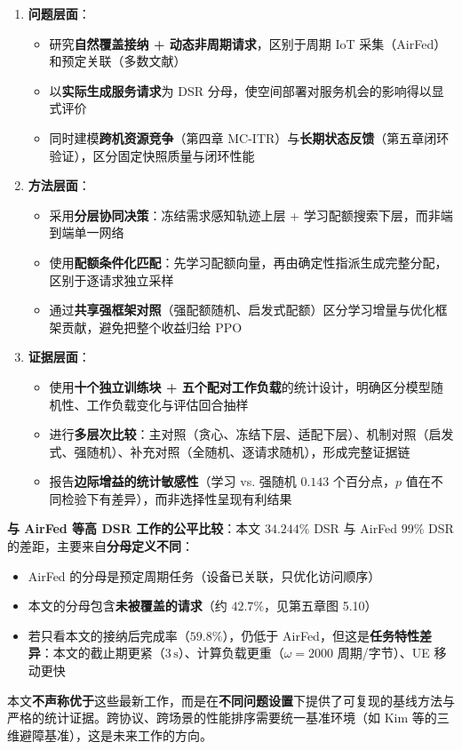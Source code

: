 \begin{enumerate}
    \item \textbf{问题层面}：
    \begin{itemize}
        \item 研究\textbf{自然覆盖接纳 + 动态非周期请求}，区别于周期 IoT 采集（AirFed）和预定关联（多数文献）
        \item 以\textbf{实际生成服务请求}为 DSR 分母，使空间部署对服务机会的影响得以显式评价
        \item 同时建模\textbf{跨机资源竞争}（第四章 MC-ITR）与\textbf{长期状态反馈}（第五章闭环验证），区分固定快照质量与闭环性能
    \end{itemize}
    \item \textbf{方法层面}：
    \begin{itemize}
        \item 采用\textbf{分层协同决策}：冻结需求感知轨迹上层 + 学习配额搜索下层，而非端到端单一网络
        \item 使用\textbf{配额条件化匹配}：先学习配额向量，再由确定性指派生成完整分配，区别于逐请求独立采样
        \item 通过\textbf{共享强框架对照}（强配额随机、启发式配额）区分学习增量与优化框架贡献，避免把整个收益归给 PPO
    \end{itemize}
    \item \textbf{证据层面}：
    \begin{itemize}
        \item 使用\textbf{十个独立训练块 + 五个配对工作负载}的统计设计，明确区分模型随机性、工作负载变化与评估回合抽样
        \item 进行\textbf{多层次比较}：主对照（贪心、冻结下层、适配下层）、机制对照（启发式、强随机）、补充对照（全随机、逐请求随机），形成完整证据链
        \item 报告\textbf{边际增益的统计敏感性}（学习 vs. 强随机 $0.143$ 个百分点，$p$ 值在不同检验下有差异），而非选择性呈现有利结果
    \end{itemize}
\end{enumerate}

\textbf{与 AirFed 等高 DSR 工作的公平比较}：本文 $34.244\%$ DSR 与 AirFed $99\%$ DSR 的差距，主要来自\textbf{分母定义不同}：
\begin{itemize}
    \item AirFed 的分母是预定周期任务（设备已关联，只优化访问顺序）
    \item 本文的分母包含\textbf{未被覆盖的请求}（约 $42.7\%$，见第五章图 5.10）
    \item 若只看本文的接纳后完成率（$59.8\%$），仍低于 AirFed，但这是\textbf{任务特性差异}：本文的截止期更紧（$3\,\mathrm{s}$）、计算负载更重（$\omega=2000$ 周期/字节）、UE 移动更快
\end{itemize}

本文\textbf{不声称优于}这些最新工作，而是在\textbf{不同问题设置}下提供了可复现的基线方法与严格的统计证据。跨协议、跨场景的性能排序需要统一基准环境（如 Kim 等的三维避障基准），这是未来工作的方向。

